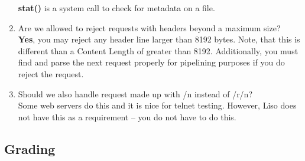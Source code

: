 \begin{enumerate}
    \textbf{stat()} is a system call to check for metadata on a file. 
    \item Are we allowed to reject requests with headers beyond a maximum size?\\
    \textbf{Yes}, you may reject any header line larger than 8192 bytes. Note, that this is different than a Content Length of greater than 8192. Additionally, you must find and parse the next request properly for pipelining purposes if you do reject the request.
    \item Should we also handle request made up with /n instead of /r/n?\\
    Some web servers do this and it is nice for telnet testing. However, Liso does not have this as a requirement -- you do not have to do this.
\end{enumerate}

\subsection{Grading}

